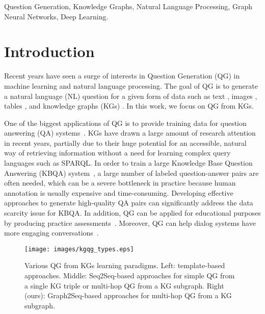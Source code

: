 \documentclass[journal]{IEEEtran}
\begin{document}
\begin{IEEEkeywords}
Question Generation, Knowledge Graphs, Natural Language Processing, Graph Neural Networks, Deep Learning.
\end{IEEEkeywords}






\IEEEpeerreviewmaketitle

\section{Introduction}
Recent years have seen a surge of interests in Question Generation (QG) in machine learning and natural language processing. The goal of QG is to generate a natural language (NL) question for a given form of data such as text \cite{du2017learning,song2018leveraging,chen2019reinforcement,pan2020semantic}, images \cite{li2018visual}, tables \cite{bao2018table}, and knowledge graphs (KGs) \cite{seyler2017knowledge}. In this work, we focus on QG from KGs.


One of the biggest applications of QG is to provide training data for question answering (QA) systems~\cite{tang2017question}.
KGs have drawn a large amount of research attention in recent years, partially due to their huge potential for an accessible, natural way of retrieving information without a need for learning complex query languages such as SPARQL. In order to train a large Knowledge Base Question Answering (KBQA) system~\cite{chen2019bidirectional,chen2021personalized}, a large number of labeled question-answer pairs are often needed, which can be a severe bottleneck in practice because human annotation is usually expensive and time-consuming.
Developing effective approaches to generate high-quality QA pairs can significantly address the data scarcity issue for KBQA.  
In addition, QG can be applied for educational purposes by producing practice assessments~\cite{heilman2010good}.
Moreover, QG can help dialog systems have more engaging conversations~\cite{mostafazadeh2016generating}.



\begin{figure}[!tb]
  \vspace{-3mm}
  \centering
\texttt{[image: images/kgqg\_types.eps]}
  \caption{Various QG from KGs learning paradigms. Left: template-based approaches. Middle: Seq2Seq-based approaches for simple QG from a single KG triple or multi-hop QG from a KG subgraph. Right (ours): Graph2Seq-based approaches for multi-hop QG from a KG subgraph.}
  \label{fig:kgqg_types}
\vspace{-4mm}
\end{figure}
\end{document}
